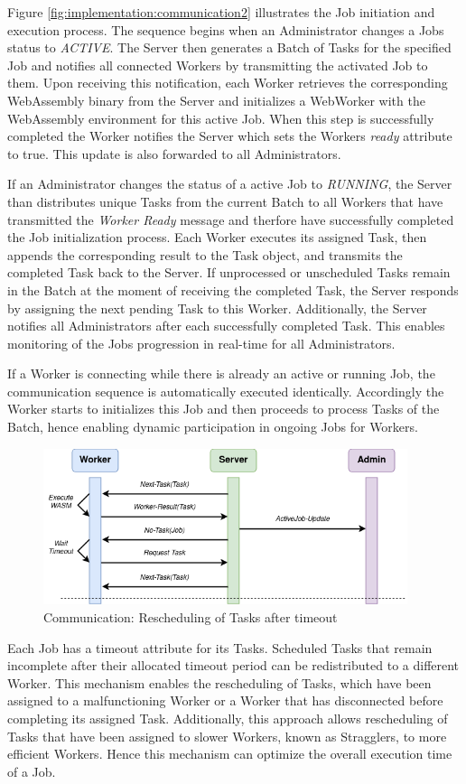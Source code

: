 Figure \ref{fig:implementation:communication2} illustrates the Job initiation and execution process. The sequence begins when an Administrator changes a Jobs status to \emph{ACTIVE}. The Server then generates a Batch of Tasks for the specified Job and notifies all connected Workers by transmitting the activated Job to them. Upon receiving this notification, each Worker retrieves the corresponding WebAssembly binary from the Server and initializes a WebWorker with the WebAssembly environment for this active Job. When this step is successfully completed the Worker notifies the Server which sets the Workers \emph{ready} attribute to true. This update is also forwarded to all Administrators.

If an Administrator changes the status of a active Job to \emph{RUNNING}, the Server than distributes unique Tasks from the current Batch to all Workers that have transmitted the \emph{Worker Ready} message and therfore have successfully completed the Job initialization process. Each Worker executes its assigned Task, then appends the corresponding result to the Task object, and transmits the completed Task back to the Server. If unprocessed or unscheduled Tasks remain in the Batch at the moment of receiving the completed Task, the Server responds by assigning the next pending Task to this Worker. Additionally, the Server notifies all Administrators after each successfully completed Task. This enables monitoring of the Jobs progression in real-time for all Administrators.

If a Worker is connecting while there is already an active or running Job, the communication sequence is automatically executed identically. Accordingly the Worker starts to initializes this Job and then proceeds to process Tasks of the Batch, hence enabling dynamic participation in ongoing Jobs for Workers.
\begin{figure}[htbp]
    \centering
    \includegraphics[width=0.95\textwidth]{gfx/figures/communication-timeout.png}
    \caption{Communication: Rescheduling of Tasks after timeout}
    \label{fig:implementation:communication3}
\end{figure}
Each Job has a timeout attribute for its Tasks. Scheduled Tasks that remain incomplete after their allocated timeout period can be redistributed to a different Worker. This mechanism enables the rescheduling of Tasks, which have been assigned to a malfunctioning Worker or a Worker that has disconnected before completing its assigned Task. Additionally, this approach allows rescheduling of Tasks that have been assigned to slower Workers, known as Stragglers, to more efficient Workers. Hence this mechanism can optimize the overall execution time of a Job.


